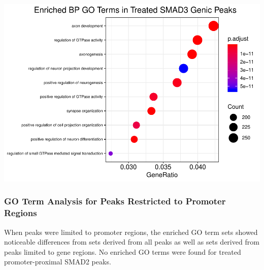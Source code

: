 \documentclass[]{article}
\begin{document}
\clearpage{}

\includegraphics{Bioinfo_Analysis_files/figure-latex/unnamed-chunk-20-1.pdf}

\hypertarget{go-term-analysis-for-peaks-restricted-to-promoter-regions}{%
\subsubsection{GO Term Analysis for Peaks Restricted to Promoter
Regions}\label{go-term-analysis-for-peaks-restricted-to-promoter-regions}}

When peaks were limited to promoter regions, the enriched GO term sets
showed noticeable differences from sets derived from all peaks as well
as sets derived from peaks limited to gene regions. No enriched GO terms
were found for treated promoter-proximal SMAD2 peaks.

\clearpage{}
\end{document}
